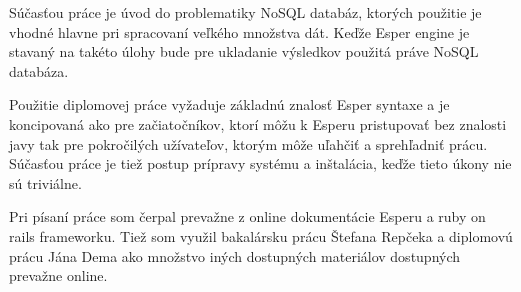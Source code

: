 Súčasťou práce je úvod do problematiky NoSQL databáz, ktorých použitie je vhodné hlavne pri spracovaní veľkého množstva dát. Keďže Esper engine je stavaný na takéto úlohy bude pre ukladanie výsledkov použitá práve NoSQL databáza.

Použitie diplomovej práce vyžaduje základnú znalosť Esper syntaxe a je koncipovaná ako pre začiatočníkov, ktorí môžu k Esperu pristupovať bez znalosti javy tak pre pokročilých užívateľov, ktorým môže uľahčiť a sprehľadniť prácu. Súčasťou práce je tiež postup prípravy systému a inštalácia, keďže tieto úkony nie sú triviálne.

Pri písaní práce som čerpal prevažne z online dokumentácie Esperu a ruby on rails frameworku. Tiež som využil bakalársku prácu Štefana Repčeka \cite{bp-repcek} a diplomovú prácu Jána Dema \cite{dp-demo} ako množstvo iných dostupných materiálov dostupných prevažne online.

\emptydoublepage